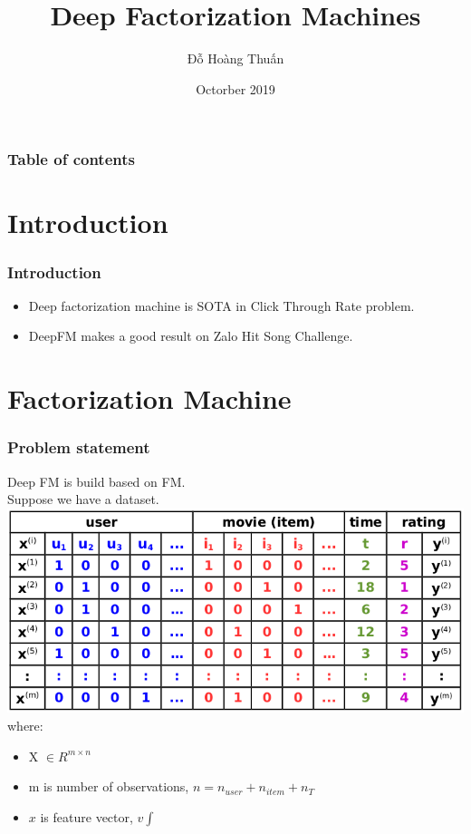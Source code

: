 \documentclass{beamer}
\title{Deep Factorization Machines}
\author{Đỗ Hoàng Thuấn}
\date{Octorber 2019}
\begin{document}
\frame{\titlepage}

\begin{frame}
\frametitle{Table of contents}
\tableofcontents
\end{frame}

\section{Introduction}
\begin{frame}
	\frametitle{Introduction}
	\begin{itemize}
 		\item Deep factorization machine is SOTA in Click Through Rate problem.
 		\item DeepFM makes a good result on Zalo Hit Song Challenge.
	\end{itemize}
\end{frame}

\section{Factorization Machine}
\frame{\tableofcontents[currentsection]}
\begin{frame}
	\frametitle{Problem statement}
	Deep FM is build based on FM. \\
	Suppose we have a dataset. \\
	\includegraphics[scale=0.35]{data} \\
	where:
	\begin{itemize}
		\item X $\in R^{m \times n}$ 
		\item m is number of observations, $n = n_{user} + n_{item} + n_T$ 
		\item $x$ is feature vector, $v \int$
	\end{itemize}
\end{frame}
\end{document}
